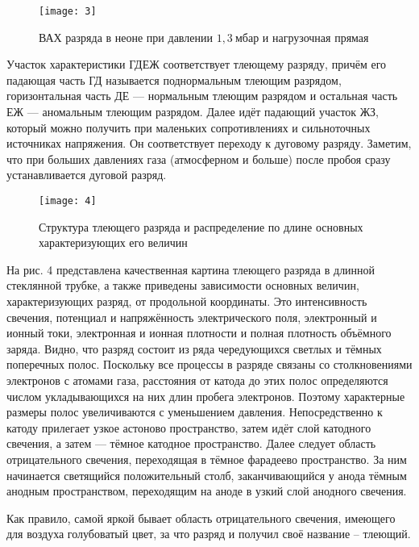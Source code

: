 \begin{figure}[H]
    \texttt{[image: 3]}
    \captionsetup{justification=centering}
    \caption{ВАХ разряда в неоне при
    давлении $1,3 \ \text{мбар}$ и
нагрузочная прямая}
\end{figure}

Участок характеристики ГДЕЖ
соответствует тлеющему разряду, 
причём его падающая часть ГД называется
поднормальным тлеющим разрядом,
горизонтальная часть ДЕ — нормальным
тлеющим разрядом и остальная часть ЕЖ —
аномальным тлеющим разрядом. Далее идёт
падающий участок ЖЗ, который можно
получить при маленьких сопротивлениях и
сильноточных источниках напряжения. Он
соответствует переходу к дуговому
разряду. Заметим, что при больших
давлениях газа (атмосферном и больше)
после пробоя сразу устанавливается
дуговой разряд.


\begin{wrapfigure}[29]{r}{0.4\linewidth}
    \texttt{[image: 4]}
    \captionsetup{justification=centering}
    \caption{Структура тлеющего разряда
    и распределение по длине основных
характеризующих его величин}
\end{wrapfigure}

На рис. 4 представлена качественная
картина тлеющего разряда в длинной
стеклянной трубке, а также приведены
зависимости основных величин,
характеризующих разряд, от продольной
координаты. Это интенсивность свечения,
потенциал и напряжённость электрического
поля, электронный и ионный токи,
электронная и ионная плотности и полная
плотность объёмного заряда.
Видно, что разряд состоит из ряда
чередующихся светлых и тёмных поперечных
полос. Поскольку все процессы в разряде
связаны со столкновениями электронов с
атомами газа, расстояния от катода до
этих полос определяются числом
укладывающихся на них длин пробега
электронов. Поэтому характерные размеры
полос увеличиваются с уменьшением
давления. Непосредственно к катоду
прилегает узкое астоново пространство,
затем идёт слой катодного свечения, а
затем — тёмное катодное пространство.
Далее следует область отрицательного
свечения, переходящая в тёмное фарадеево
пространство. За ним начинается
светящийся положительный столб,
заканчивающийся у анода тёмным анодным
пространством, переходящим на аноде в
узкий слой анодного свечения.

Как правило, самой яркой бывает область отрицательного свечения, имеющего для воздуха голубоватый цвет, за что разряд и получил своё 
название -- тлеющий.

